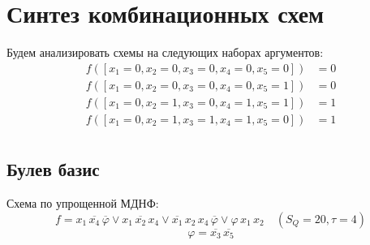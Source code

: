 \documentclass{article}
\begin{document}
\section*{Синтез комбинационных схем}
Будем анализировать схемы на следующих наборах аргументов:
\begin{align*}
    f([x_1 = 0, x_2 = 0, x_3 = 0, x_4 = 0, x_5 = 0]) &= 0 \\
    f([x_1 = 0, x_2 = 0, x_3 = 0, x_4 = 0, x_5 = 1]) &= 0 \\
    f([x_1 = 0, x_2 = 1, x_3 = 0, x_4 = 1, x_5 = 1]) &= 1 \\
    f([x_1 = 0, x_2 = 1, x_3 = 1, x_4 = 1, x_5 = 0]) &= 1 \\
\end{align*}
\subsection*{Булев базис}
Схема по упрощенной МДНФ:
\[f = x_{1} \, \overline{x_{4}} \, \overline{\varphi} \lor x_{1} \, \overline{x_{2}} \, x_{4} \lor \overline{x_{1}} \, x_{2} \, x_{4} \, \overline{\varphi} \lor \varphi \, x_{1} \, x_{2}\quad(S_Q = 20, \tau = 4)\]
\[\varphi = \overline{x_{3}} \, \overline{x_{5}}\]
\end{document}
